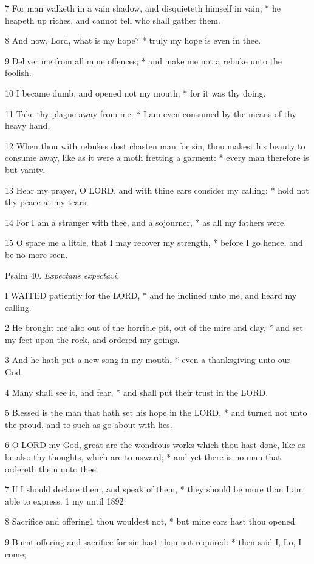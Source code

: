 7 For man walketh in a vain shadow, and disquieteth
himself in vain; * he heapeth up riches, and cannot tell who shall gather
them.

8 And now, Lord, what is my hope? * truly my hope is
even in thee.

9 Deliver me from all mine offences; * and make me
not a rebuke unto the foolish.

10 I became dumb, and opened not my mouth; * for it
was thy doing.

11 Take thy plague away from me: * I am even consumed
by the means of thy heavy hand.

12 When thou with rebukes dost chasten man for sin,
thou makest his beauty to consume away, like as it were a moth fretting
a garment: * every man therefore is but vanity.

13 Hear my prayer, O LORD, and
with thine ears consider my calling; * hold not thy peace at my tears;

14 For I am a stranger with thee, and a sojourner,
* as all my fathers were.

15 O spare me a little, that I may recover my strength,
* before I go hence, and be no more seen.

Psalm
40. \emph{Expectans expectavi.}

I
WAITED patiently for the LORD, * and he inclined
unto me, and heard my calling.

2 He brought me also out of the horrible pit, out of
the mire and clay, * and set my feet upon the rock, and ordered my goings.

3 And he hath put a new song in my mouth, * even a
thanksgiving unto our God.

4 Many shall see it, and fear, * and shall put their
trust in the LORD.

5 Blessed is the man that hath set his hope in the
LORD, * and turned not unto the proud, and to such
as go about with lies.

6 O LORD my God, great are the
wondrous works which thou hast done, like as be also thy thoughts, which
are to usward; * and yet there is no man that ordereth them unto thee.

7 If I should declare them, and speak of them, * they
should be more than I am able to express. 1 my until
1892.

8 Sacrifice and offering1 thou wouldest
not, * but mine ears hast thou opened.

9 Burnt-offering and sacrifice for sin hast thou not
required: * then said I, Lo, I come;


